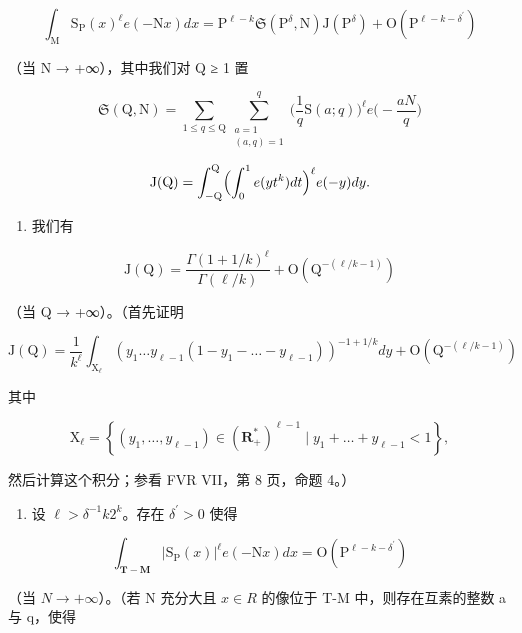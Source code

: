\[
\int_ {\mathrm{M}} \mathrm{S} _ {\mathrm{P}} (x) ^ {\ell} e (- \mathrm{N} x) d x = \mathrm{P} ^ {\ell - k} \mathfrak {S} (\mathrm{P} ^ {\delta}, \mathrm{N}) \mathrm{J} (\mathrm{P} ^ {\delta}) + \mathrm{O} (\mathrm{P} ^ {\ell - k - \delta^ {\prime}})
\]

（当 N → +∞），其中我们对 Q ≥ 1 置

\[
\mathfrak{S}(\mathrm{Q},\mathrm{N}) = \sum_{1\leqslant q\leqslant \mathrm{Q}}\sum_{\substack{a = 1\\ (a,q) = 1}}^{q}\Big(\frac{1}{q}\mathrm{S}(a;q)\Big)^{\ell}e\Big(-\frac{aN}{q}\Big)
\]

\[
\mathrm{J(Q)} = \int_ {- \mathrm{Q}} ^ {\mathrm{Q}} \Bigl (\int_ {0} ^ {1} e (y t ^ {k}) d t \Bigr) ^ {\ell} e (- y) d y.
\]

\begin{enumerate}
\def\labelenumi{\alph{enumi})}
\setcounter{enumi}{3}
\tightlist
\item
  我们有
\end{enumerate}

\[
\mathrm{J} (\mathrm{Q}) = \frac {\Gamma (1 + 1 / k) ^ {\ell}}{\Gamma (\ell / k)} + \mathrm{O} (\mathrm{Q} ^ {- (\ell / k - 1)})
\]

（当 Q → +∞）。（首先证明

\[
\mathrm{J} (\mathrm{Q}) = \frac {1}{k ^ {\ell}} \int_ {\mathrm{X} _ {\ell}} (y _ {1} \dots y _ {\ell - 1} (1 - y _ {1} - \dots - y _ {\ell - 1})) ^ {- 1 + 1 / k} d y + \mathrm{O} (\mathrm{Q} ^ {- (\ell / k - 1)})
\]

其中

\[
\mathrm{X} _ {\ell} = \left\{\left(y _ {1}, \dots , y _ {\ell - 1}\right) \in \left(\mathbf {R} _ {+} ^ {*}\right) ^ {\ell - 1} \mid y _ {1} + \dots + y _ {\ell - 1} <   1 \right\},
\]

然后计算这个积分；参看 FVR VII，第 8 页，命题 4。）

\begin{enumerate}
\def\labelenumi{\alph{enumi})}
\setcounter{enumi}{4}
\tightlist
\item
  设 \(\ell >\delta^{-1}k2^{k}\)。存在 \(\delta^{\prime} > 0\) 使得
\end{enumerate}

\[
\int_ {\mathbf {T - M}} | \mathrm{S} _ {\mathrm{P}} (x) | ^ {\ell} e (- \mathrm{N} x) d x = \mathrm{O} (\mathrm{P} ^ {\ell - k - \delta^ {\prime}})
\]

（当 \(N \rightarrow +\infty\)）。（若 N 充分大且 \(x \in R\) 的像位于 T-M 中，则存在互素的整数 a 与 q，使得

